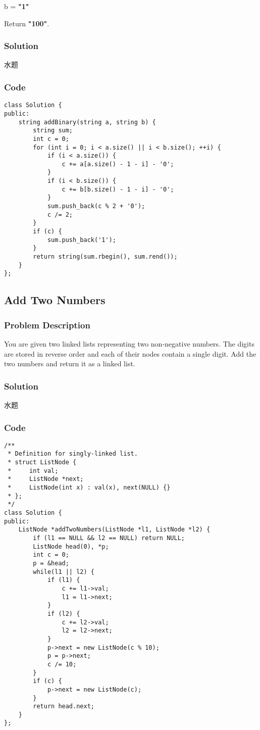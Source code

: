 \documentclass[courier]{article}
\begin{document}
\begin{CJK*}{UTF8}{gkai}
b = \textbf{"1"}


Return \textbf{"100"}.



\subsubsection*{Solution}
水题

\subsubsection*{Code}
\begin{lstlisting}
class Solution {
public:
    string addBinary(string a, string b) {
        string sum;
        int c = 0;
        for (int i = 0; i < a.size() || i < b.size(); ++i) {
            if (i < a.size()) {
                c += a[a.size() - 1 - i] - '0';
            }
            if (i < b.size()) {
                c += b[b.size() - 1 - i] - '0';
            }
            sum.push_back(c % 2 + '0');
            c /= 2;
        }
        if (c) {
            sum.push_back('1');
        }
        return string(sum.rbegin(), sum.rend());
    }
}; 
\end{lstlisting}


\subsection{ Add Two Numbers }

\subsubsection*{Problem Description}
You are given two linked lists representing two non-negative numbers. The digits are stored in reverse order and each of their nodes contain a single digit. Add the two numbers and return it as a linked list.



\subsubsection*{Solution}
水题

\subsubsection*{Code}
\begin{lstlisting}
/**
 * Definition for singly-linked list.
 * struct ListNode {
 *     int val;
 *     ListNode *next;
 *     ListNode(int x) : val(x), next(NULL) {}
 * };
 */
class Solution {
public:
    ListNode *addTwoNumbers(ListNode *l1, ListNode *l2) {
        if (l1 == NULL && l2 == NULL) return NULL;
        ListNode head(0), *p;
        int c = 0;
        p = &head;
        while(l1 || l2) {
            if (l1) {
                c += l1->val;
                l1 = l1->next;
            }
            if (l2) {
                c += l2->val;
                l2 = l2->next;
            }
            p->next = new ListNode(c % 10);
            p = p->next;
            c /= 10;
        }
        if (c) {
            p->next = new ListNode(c);
        }
        return head.next;
    }
}; 
\end{lstlisting}



\end{CJK*}
\end{document}
